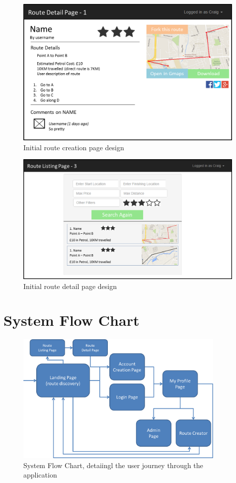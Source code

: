 \documentclass[a4paper,twoside,notitlepage,11pt]{article}
\begin{document}
\begin{figure}[!ht]
	\begin{center}
			\includegraphics[width=0.99\textwidth]{images/ui-detail-1.png}
	\end{center}
	\vspace{-6mm}
	\caption{Initial route creation page design}
\end{figure}
\begin{figure}[!ht]
	\begin{center}
			\includegraphics[width=0.99\textwidth]{images/ui-rlp-3.png}
	\end{center}
	\vspace{-6mm}
	\caption{Initial route detail page design}
\end{figure}

\newpage 
\section{System Flow Chart}
\label{app-sfc}
 \begin{figure}[!ht]
 	\begin{center}
 		\includegraphics[width=0.9\textwidth]{images/flow.png}
 	\end{center}
 	\caption{System Flow Chart, detaiingl the user journey through the application}
 \end{figure}
\end{document}
